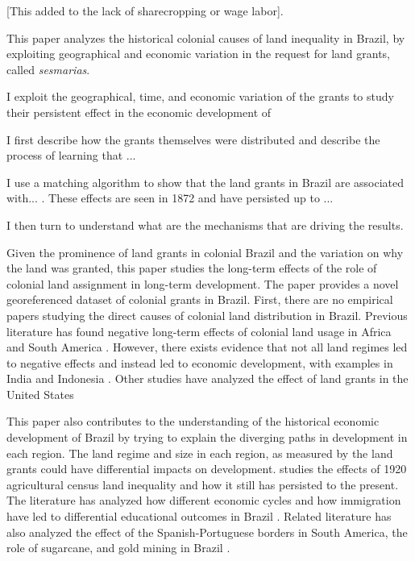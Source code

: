 \documentclass{article}
\begin{document}
[This added to the lack of sharecropping or wage labor].

This paper analyzes the historical colonial causes of land inequality in Brazil, by exploiting geographical and economic variation in the request for land grants, called \textit{sesmarias}.

I exploit the geographical, time, and economic variation of the grants to study their persistent effect in the economic development of

I first describe how the grants themselves were distributed and describe the process of learning that ...

I use a matching algorithm to show that the land grants in Brazil are associated with... . These effects are seen in 1872 and have persisted up to ... 

I then turn to understand what are the mechanisms that are driving the results. 

Given the prominence of land grants in colonial Brazil and the variation on why the land was granted, this paper studies the long-term effects of the role of colonial land assignment in long-term development.  
The paper provides a novel georeferenced dataset of colonial grants in Brazil. 
First, there are no empirical papers studying the direct causes of colonial land distribution in Brazil. 
Previous literature has found negative long-term effects of colonial land usage in Africa and South America \parencites{Dell2010-qt}{Lowes2021-ww}. 
However, there exists evidence that not all land regimes led to negative effects and instead led to economic development, with examples in India and Indonesia \parencites{Banerjee2005-ki}{Dell2019-np}{Ratnoo2023-vw}.  
Other studies have analyzed the effect of land grants in the United States \parencites{Akee2014-uw}{Allen2019-kh}{Smith2023-ip}

This paper also contributes to the understanding of the historical economic development of Brazil by trying to explain the diverging paths in development in each region. 
The land regime and size in each region, as measured by the land grants could have differential impacts on development.
\textcite{Wigton-Jones2020-ex} studies the effects of 1920 agricultural census land inequality and how it still has persisted to the present.
The literature has analyzed how different economic cycles and how immigration have led to differential educational outcomes in Brazil \parencites{Musacchio2014-pq}{Rocha2017-yq}.
Related literature has also analyzed the effect of the Spanish-Portuguese borders in South America, the role of sugarcane, and gold mining in Brazil \parencites{Laudares2022-vy}{Naritomi2012-or}.
\end{document}
